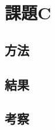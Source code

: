 %
%
\section{課題C}
\label{taskC}

%
%
\subsection{方法}
\label{taskC_method}

%
%
\subsection{結果}
\label{taskC_result}

%
%
\subsection{考察}
\label{taskC_consideration}

